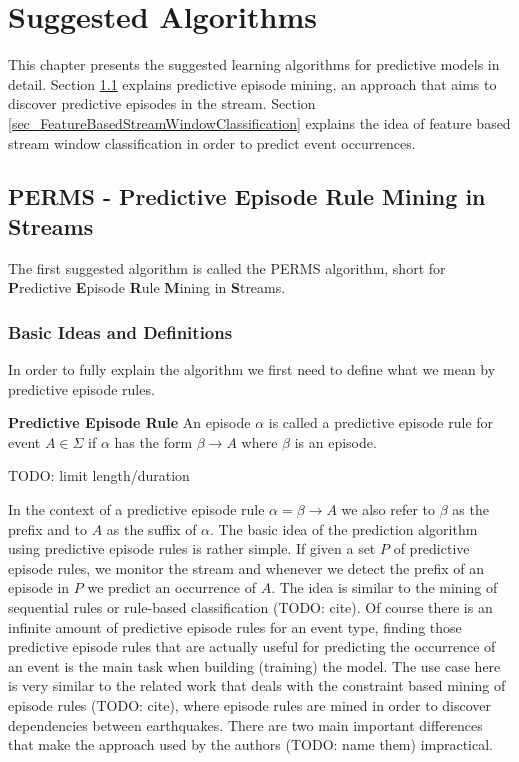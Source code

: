\chapter{Suggested Algorithms}
\label{chapter_solutions}

\ifpdf
    \graphicspath{{Chapter4/Figs/Raster/}{Chapter4/Figs/PDF/}{Chapter4/Figs/}}
\else
    \graphicspath{{Chapter4/Figs/Vector/}{Chapter4/Figs/}}
\fi

This chapter presents the suggested learning algorithms for predictive models in detail. Section \ref{sec_predictiveEpisodeMining} explains predictive episode mining, an approach that aims to discover predictive episodes in the stream. Section \ref{sec_FeatureBasedStreamWindowClassification} explains the idea of feature based stream window classification in order to predict event occurrences. 

\section{PERMS - Predictive Episode Rule Mining in Streams}
\label{sec_predictiveEpisodeMining}
The first suggested algorithm is called the PERMS algorithm, short for \textbf{P}redictive \textbf{E}pisode \textbf{R}ule \textbf{M}ining in \textbf{S}treams.

\subsection{Basic Ideas and Definitions}
In order to fully explain the algorithm we first need to define what we mean by predictive episode rules.

\begin{mydef}
\label{def_predictiveEpisode}
\textbf{Predictive Episode Rule} An episode $\alpha$ is called a predictive episode rule for event $A \in \Sigma$ if $\alpha$ has the form $\beta \rightarrow A$ where $\beta$ is an episode. 
\end{mydef}

TODO: limit length/duration 

In the context of a predictive episode rule $\alpha = \beta \rightarrow A$ we also refer to $\beta$ as the prefix and to $A$ as the suffix of $\alpha$. 
The basic idea of the prediction algorithm using predictive episode rules is rather simple. If given a set $P$ of predictive episode rules, we monitor the stream and whenever we detect the prefix of an episode in $P$ we predict an occurrence of $A$. The idea is similar to the mining of sequential rules or rule-based classification (TODO: cite).
Of course there is an infinite amount of predictive episode rules for an event type, finding those predictive episode rules that are actually useful for predicting the occurrence of an event is the main task when building (training) the model. The use case here is very similar to the related work that deals with the constraint based mining of episode rules (TODO: cite), where episode rules are mined in order to discover dependencies between earthquakes. There are two main important differences that make the approach used by the authors (TODO: name them) impractical.

